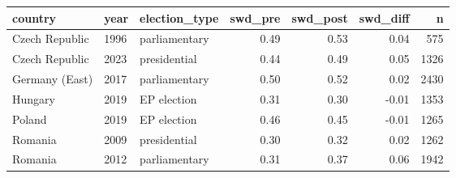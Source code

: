 
\begin{tabular}{l|l|l|r|r|r|r}
\hline
country & year & election\_type & swd\_pre & swd\_post & swd\_diff & n\\
\hline
Czech Republic & 1996 & parliamentary & 0.49 & 0.53 & 0.04 & 575\\
\hline
Czech Republic & 2023 & presidential & 0.44 & 0.49 & 0.05 & 1326\\
\hline
Germany (East) & 2017 & parliamentary & 0.50 & 0.52 & 0.02 & 2430\\
\hline
Hungary & 2019 & EP election & 0.31 & 0.30 & -0.01 & 1353\\
\hline
Poland & 2019 & EP election & 0.46 & 0.45 & -0.01 & 1265\\
\hline
Romania & 2009 & presidential & 0.30 & 0.32 & 0.02 & 1262\\
\hline
Romania & 2012 & parliamentary & 0.31 & 0.37 & 0.06 & 1942\\
\hline
\end{tabular}
